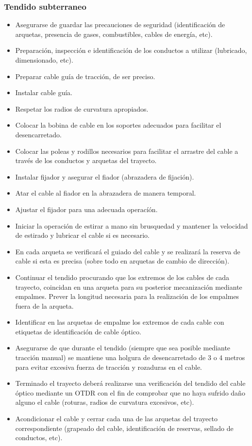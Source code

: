 \documentclass[12pt,letterpaper]{article}
\begin{document}
\subsubsection{Tendido subterraneo}
\begin{itemize}
    \item Asegurarse de guardar las precauciones de seguridad (identificación de arquetas, 
    presencia de gases, combustibles, cables de energía, etc).
    \item Preparación, inspección e identificación de los conductos a utilizar (lubricado, 
    dimensionado, etc).
    \item Preparar cable guía de tracción, de ser preciso.
    \item Instalar cable guía.
    \item Respetar los radios de curvatura apropiados.
    \item Colocar la bobina de cable en los soportes adecuados para facilitar el 
    desencarretado.
    \item Colocar las poleas y rodillos necesarios para facilitar el arrastre del cable 
    a través de los conductos y arquetas del trayecto.
    \item Instalar fijador y asegurar el fiador (abrazadera de fijación).
    \item Atar el cable al fiador en la abrazadera de manera temporal.
    \item Ajustar el fijador para una adecuada operacíón.
    \item Iniciar la operación de estirar a mano sin brusquedad y mantener la velocidad 
    de estirado y lubricar el cable si es necesario.
    \item En cada arqueta se verificará el guiado del cable y se realizará la reserva de 
    cable si esta es precisa (sobre todo en arquetas de cambio de dirección).
    \item Continuar el tendido procurando que los extremos de los cables de cada trayecto, 
    coincidan en una arqueta para su posterior mecanización mediante empalmes. Prever 
    la longitud necesaria para la realización de los empalmes fuera de la arqueta.
    \item Identificar en las arquetas de empalme los extremos de cada cable con etiquetas 
    de identificación de cable óptico.
    \item Asegurarse de que durante el tendido (siempre que sea posible mediante tracción 
    manual) se mantiene una holgura de desencarretado de 3 o 4 metros para evitar excesiva 
    fuerza de tracción y rozaduras en el cable.
    \item Terminado el trayecto deberá realizarse una verificación del tendido del cable 
    óptico mediante un OTDR con el fin de comprobar que no haya sufrido daño alguno el 
    cable (roturas, radios de curvatura excesivos, etc).
    \item Acondicionar el cable y cerrar cada una de las arquetas del trayecto 
    correspondiente (grapeado del cable, identificación de reservas, sellado de conductos, 
    etc).
\end{itemize}
\end{document}
